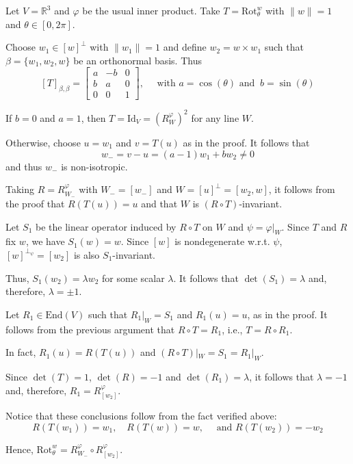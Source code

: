 \begin{example}
  Let $V = \mathbb{R}^3$ and $\varphi$ be the usual inner product. Take $T = \text{Rot}_\theta^w$ with $\| w \| = 1$ and $\theta \in [0, 2 \pi]$. 

  Choose $w_1 \in [w]^\perp$ with $\| w_1 \| = 1$ and define $w_2 = w \times w_1$ such that $\beta = \{ w_1, w_2, w \}$ be an orthonormal basis. Thus 
  \[
    [T]_{\beta, \beta} = \begin{bmatrix}
      a & -b & 0 \\
      b &  a & 0 \\
      0 &  0 & 1
    \end{bmatrix},
    \quad \text{ with } a = \cos(\theta) \text{ and } ~b = \sin(\theta)
  \]

  If $b = 0$ and $a = 1$, then $T = \text{Id}_V = (R_W^\varphi)^2$ for any line $W$. 

  Otherwise, choose $u = w_1$ and $v = T(u)$ as in the proof. It follows that 
  \[
    w_- = v-u = (a-1)w_1 + bw_2 \neq 0 
  \]
  and thus $w_-$ is non-isotropic. 

  Taking $R = R_{W_-}^\varphi$ with $W_- = [w_-]$ and $W = [u]^\perp = [w_2, w]$, it follows from the proof that $R(T(u)) = u$ and that $W$ is $(R \circ T)$-invariant. 

  Let $S_1$ be the linear operator induced by $R \circ T$ on $W$  and $\psi = \varphi|_W$. Since $T$ and $R$ fix $w$, we have $S_1(w) = w$. Since $[w]$ is nondegenerate w.r.t. $\psi$, $[w]^{\perp_\psi} = [w_2]$ is also $S_1$-invariant. 

  Thus, $S_1(w_2) = \lambda w_2$ for some scalar $\lambda$. It follows that $\det(S_1) = \lambda$ and, therefore, $\lambda = \pm 1$. 

  Let $R_1 \in \text{End}(V)$ such that $R_1|_W = S_1$ and $R_1(u) = u$, as in the proof. It follows from the previous argument that $R \circ T = R_1$, i.e., $T = R \circ R_1$. 

  In fact, $R_1(u) = R(T(u))$ and $(R \circ T)|_W = S_1 = R_1|_W$. 

  Since $\det(T) = 1$, $\det(R) = -1$ and $\det(R_1) = \lambda$, it follows that $\lambda = -1$ and, therefore, $R_1 = R_{[w_2]}^\varphi$. 

  Notice that these conclusions follow from the fact verified above:
  \[
    R(T(w_1)) = w_1, \quad R(T(w)) = w, \quad \text{ and } R(T(w_2)) = -w_2
  \]

  Hence, $\text{Rot}_\theta^w = R_{W_-}^\varphi \circ R_{[w_2]}^\varphi$. 
\end{example}

